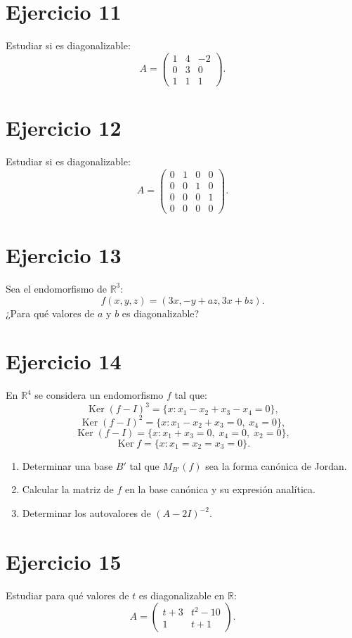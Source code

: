 \documentclass[11pt,a4paper]{article}
\newcommand{\R}{\mathbb{R}}
\newcommand{\Ker}{\operatorname{Ker}}
\begin{document}
\section{Ejercicio 11}
Estudiar si es diagonalizable:
\[
A=
\begin{pmatrix}
1&4&-2\\
0&3&0\\
1&1&1
\end{pmatrix}.
\]

\section{Ejercicio 12}
Estudiar si es diagonalizable:
\[
A=
\begin{pmatrix}
0&1&0&0\\
0&0&1&0\\
0&0&0&1\\
0&0&0&0
\end{pmatrix}.
\]

\section{Ejercicio 13}
Sea el endomorfismo de $\R^3$:
\[
f(x,y,z)=(3x,-y+az,3x+bz).
\]
¿Para qué valores de $a$ y $b$ es diagonalizable?

\section{Ejercicio 14}
En $\R^4$ se considera un endomorfismo $f$ tal que:
\[
\Ker(f-I)^3
=
\{x:x_1-x_2+x_3-x_4=0\},
\]
\[
\Ker(f-I)^2
=
\{x:x_1-x_2+x_3=0,\;x_4=0\},
\]
\[
\Ker(f-I)
=
\{x:x_1+x_3=0,\;x_4=0,\;x_2=0\},
\]
\[
\Ker f
=
\{x:x_1=x_2=x_3=0\}.
\]
\begin{enumerate}[label=\alph*)]
\item Determinar una base $B'$ tal que $M_{B'}(f)$ sea la forma canónica de Jordan.
\item Calcular la matriz de $f$ en la base canónica y su expresión analítica.
\item Determinar los autovalores de $(A-2I)^{-2}$.
\end{enumerate}

\section{Ejercicio 15}
Estudiar para qué valores de $t$ es diagonalizable en $\R$:
\[
A=
\begin{pmatrix}
t+3&t^2-10\\
1&t+1
\end{pmatrix}.
\]
\end{document}
